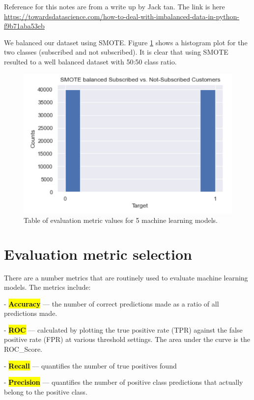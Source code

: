 Reference for this notes are from a write up by Jack tan. The link is here \url{https://towardsdatascience.com/how-to-deal-with-imbalanced-data-in-python-f9b71aba53eb}

We balanced our dataset using SMOTE. Figure \ref{fig:smote_balanced} shows a histogram plot for the two classes (subscribed and not subscribed). It is clear that using SMOTE resulted to a well balanced dataset with 50:50 class ratio. 

\begin{figure}[tbh]
\centering
\includegraphics[width = 1.0\hsize]{./resources/img/fig_smote_balanced_count.png}
\caption{Table of evaluation metric values for 5 machine learning models.} 
\label{fig:smote_balanced}
\end{figure}

\section{Evaluation metric selection}
There are a number metrics that are routinely used to evaluate machine learning models. The metrics include:

- \textbf{\hl{Accuracy}} — the number of correct predictions made as a ratio of all predictions made.

- \textbf{\hl{ROC}} — calculated by plotting the true positive rate (TPR) against the false positive rate (FPR) at various threshold settings. The area under the curve is the ROC_Score.

- \textbf{\hl{Recall}} — quantifies the number of true positives found

- \textbf{\hl{Precision}} — quantifies the number of positive class predictions that actually belong to the positive class.

